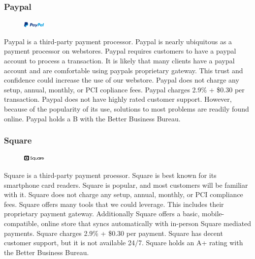 \documentclass[letterpaper]{article}
\begin{document}
      \subsubsection{Paypal}
        \begin{figure}
          \centering
          \includegraphics[width=0.1\textwidth]{paypal}
        \end{figure}
        Paypal is a third-party payment processor. Paypal is nearly ubiquitous as a payment processor on webstores. Paypal requires customers to have a paypal account to process a transaction.
        It is likely that many clients have a paypal account and are comfortable using paypals proprietary gateway. This trust and confidence
        could increase the use of our webstore. Paypal does not charge any setup, annual, monthly, or PCI copliance fees. Paypal charges 2.9\% + \$0.30 per transaction.
        Paypal does not have highly rated customer support. However, because of the popularity of its use, solutions to most problems are readily found online. Paypal holds a
        B with the Better Business Bureau.
      \newpage
      \subsubsection{Square}
        \begin{figure}
          \centering
          \includegraphics[width=0.1\textwidth]{square}
        \end{figure}
        Square is a third-party payment proessor. Square is best known for its smartphone card readers. Square is popular, and most customers will be
        familiar with it. Square does not charge any setup, annual, monthly, or PCI compliance fees. Square offers many tools that we could leverage.
        This includes their proprietary payment gateway. Additionally Square offers a basic, mobile-compatible, online store that syncs automatically with in-person Square mediated payments.
        Square charges 2.9\% + \$0.30 per payment. Square has decent customer support, but it is not available 24/7. Square holds an A+ rating with the Better Business Bureau.
\end{document}
